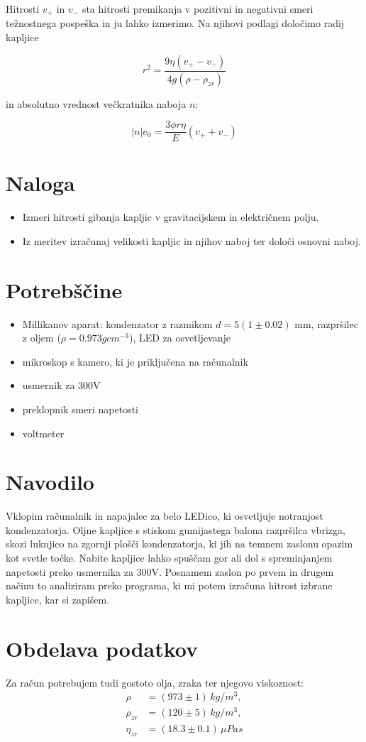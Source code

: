 \documentclass[12pt]{report}
\begin{document}
Hitrosti $v_+$ in $v_-$ sta hitrosti premikanja v pozitivni in negativni smeri težnostnega pospeška in ju lahko izmerimo. Na njihovi podlagi določimo radij kapljice 

\begin{equation}
  r^2 = \frac{9\eta (v_+ - v_-)}{4g(\rho - \rho_{zr})}
\end{equation}

in absolutno vrednost večkratnika naboja $n$: 

\begin{equation}
  |n|e_0 = \frac{3\phi r \eta}{E}(v_+ + v_-)
\end{equation}
  
\chapter*{Naloga}

\begin{itemize}
  \item Izmeri hitrosti gibanja kapljic v gravitacijskem in električnem polju. 
  \item Iz meritev izračunaj velikosti kapljic in njihov naboj ter določi osnovni naboj. 
\end{itemize}


\begingroup
\let\clearpage\relax

\chapter*{Potrebščine}
\begin{itemize}
  \item Millikanov aparat: kondenzator z razmikom $d = 5(1 \pm 0.02)$ mm, razpršilec z oljem ($\rho = 0.973g cm^{-3}$), LED za osvetljevanje 
  \item mikroskop s kamero, ki je priključena na računalnik 
  \item usmernik za 300V
  \item preklopnik smeri napetosti 
  \item voltmeter
\end{itemize}

\chapter*{Navodilo}

Vklopim računalnik in napajalec za belo LEDico, ki osvetljuje notranjost kondenzatorja. Oljne kapljice s stiskom gumijastega balona razpršilca vbrizga, skozi luknjico na zgornji plošči kondenzatorja, ki jih na temnem zaslonu opazim kot svetle točke. Nabite kapljice lahko spuščam gor ali dol s spreminjanjem napetosti preko usmernika za 300V. Posnamem zaslon po prvem in drugem načinu to analiziram preko programa, ki mi potem izračuna hitrost izbrane kapljice, kar si zapišem. 

\endgroup


\chapter*{Obdelava podatkov}

Za račun potrebujem tudi gostoto olja, zraka ter njegovo viskoznost: 
\begin{align*}
  \rho &= (973 \pm 1)\,\si{kg/m^3}, \\
  \rho_{zr} &= (120 \pm 5)\,\si{kg/m^3}, \\
  \eta_{zr} &= (18.3 \pm 0.1)\,\si{\mu Pas}
\end{align*}
\end{document}
